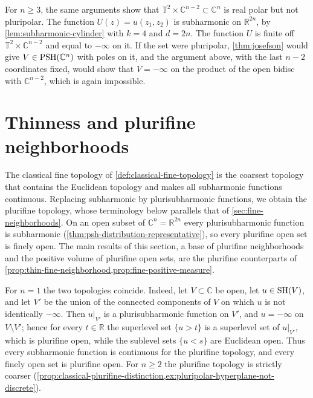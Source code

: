 \begin{example}
For $n\ge3$, the same arguments show that $\mathbb T^2\times\mathbb C^{n-2}\subset\mathbb C^n$ is real polar but not pluripolar. The function $U(z)=u(z_1,z_2)$ is subharmonic on $\mathbb R^{2n}$, by \cref{lem:subharmonic-cylinder} with $k=4$ and $d=2n$. The function $U$ is finite off $\mathbb T^2\times\mathbb C^{n-2}$ and equal to $-\infty$ on it. If the set were pluripolar, \cref{thm:josefson} would give $V\in\mathrm{PSH}(\mathbb C^n)$ with poles on it, and the argument above, with the last $n-2$ coordinates fixed, would show that $V=-\infty$ on the product of the open bidisc with $\mathbb C^{n-2}$, which is again impossible.
\end{example}

\section{Thinness and plurifine neighborhoods}
\label{sec:plurifine-neighborhoods}

The classical fine topology of \cref{def:classical-fine-topology} is the coarsest topology that contains the Euclidean topology and makes all subharmonic functions continuous. Replacing subharmonic by plurisubharmonic functions, we obtain the plurifine topology, whose terminology below parallels that of \cref{sec:fine-neighborhoods}. On an open subset of $\mathbb C^n=\mathbb R^{2n}$ every plurisubharmonic function is subharmonic (\cref{thm:psh-distribution-representative}), so every plurifine open set is finely open. The main results of this section, a base of plurifine neighborhoods and the positive volume of plurifine open sets, are the plurifine counterparts of \cref{prop:thin-fine-neighborhood,prop:fine-positive-measure}.

For $n=1$ the two topologies coincide. Indeed, let $V\subset\mathbb C$ be open, let $u\in\mathrm{SH}(V)$, and let $V'$ be the union of the connected components of $V$ on which $u$ is not identically $-\infty$. Then $u|_{V'}$ is a plurisubharmonic function on $V'$, and $u=-\infty$ on $V\setminus V'$; hence for every $t\in\mathbb R$ the superlevel set $\{u>t\}$ is a superlevel set of $u|_{V'}$, which is plurifine open, while the sublevel sets $\{u<s\}$ are Euclidean open. Thus every subharmonic function is continuous for the plurifine topology, and every finely open set is plurifine open. For $n\ge2$ the plurifine topology is strictly coarser (\cref{prop:classical-plurifine-distinction,ex:pluripolar-hyperplane-not-discrete}).

